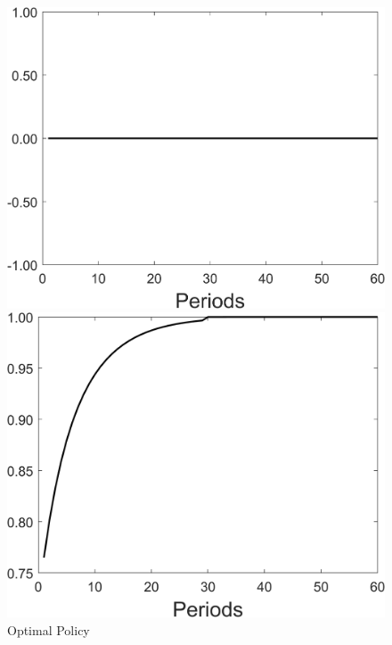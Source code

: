 \begin{figure}[h!!]
	\centering
	\caption{Optimal Policy }\label{fig:optpol}
	\begin{minipage}[]{0.32\textwidth}
		\includegraphics[width=1\textwidth]{../codding_model/Own/figures/Rep_agent/staticRam_LF_separate_tauul_periods59_eppsilon4.00_zeta1.40_Ad08_Ac04_thetac0.70_thetad0.56_HetGrowth1_tauul0.181_util0_withtarget0_lgd0.png}
	\end{minipage}
	\begin{minipage}[]{0.32\textwidth}
	\includegraphics[width=1\textwidth]{../codding_model/Own/figures/Rep_agent/staticRam_LF_separate_tauul_periods59_eppsilon4.00_zeta1.40_Ad08_Ac04_thetac0.70_thetad0.56_HetGrowth1_tauul0.181_util0_withtarget1_lgd0.png}

\end{minipage}
\end{figure}
